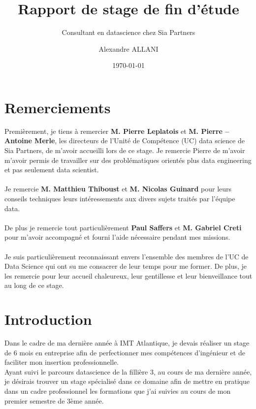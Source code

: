 \documentclass{article} %
\author{Alexandre ALLANI}
\date{\noexpand\today} %
\title{Rapport de stage de fin d'étude}
\subtitle{Consultant en datascience chez Sia Partners}
\begin{document}
\imtaMaketitlepage

\section{Remerciements}
Premièrement, je tiens à remercier \textbf{M. Pierre Leplatois} et \textbf{M. Pierre – Antoine
Merle}, les directeurs de l’Unité de Compétence (UC) data science de Sia Partners, de
m’avoir accueilli lors de ce stage. Je remercie Pierre de m'avoir m'avoir permis de travailler sur des problématiques orientés plus data engineering et pas seulement data scientist.
\\ \\

Je remercie \textbf{M. Matthieu Thiboust} et \textbf{M. Nicolas Guinard}  pour leurs conseils techniques leurs intéressements aux divers sujets traités par l’équipe data.
\\ \\

De plus je remercie tout particulièrement \textbf{Paul Saffers} et \textbf{M. Gabriel Creti} pour m'avoir accompagné et fourni l'aide nécessaire pendant mes missions. 
\\ \\

Je suis particulièrement reconnaissant envers l’ensemble des membres de l’UC de Data Science qui ont su me consacrer de leur temps pour me former. De plus, je les remercie pour leur accueil chaleureux, leur gentillesse et leur bienveillance tout au long de ce stage.

\newpage

\tableofcontents


\newpage


\section{Introduction}

Dans le cadre de ma dernière année à IMT Atlantique, je devais réaliser un stage
de 6 mois en entreprise afin de perfectionner mes compétences d’ingénieur et de
faciliter mon insertion professionnelle.\\

Ayant suivi le parcours datascience de la fillière 3, au cours de ma dernière année, je désirais trouver un stage spécialisé dans ce domaine afin de mettre en pratique dans un cadre professionnel les formations que j’ai suivies au cours de mon premier semestre de 3ème année.\\
\end{document}
